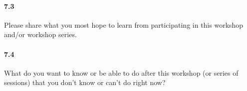 \documentclass[020-persona\_validation.tex]{subfiles}
\begin{document}
        \paragraph{7.3}

            Please share what you most hope to learn from participating in this workshop and/or workshop series.

        \paragraph{7.4}

            What do you want to know or be able to do after this workshop (or series of sessions) that you don't know or can't do right now?
\end{document}
